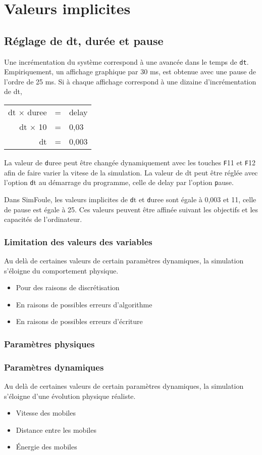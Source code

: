 %
\section{Valeurs implicites}
%
%
\subsection{Réglage de dt, durée et pause}
Une incrémentation du système correspond à une avancée dans le temps de \texttt{dt}.
Empiriquement, un affichage graphique par 30 ms, est obtenue avec une pause de l'ordre de 25 ms. Si à chaque affichage correspond à une dizaine d'incrémentation de dt, 
\begin{center}
	\begin{tabular}{rcl}
	dt $\times$ duree & = & delay\\
	dt $\times$ 10 & = & 0,03\\
	dt & = & 0,003\\
	\end{tabular}
\end{center}
La valeur de {\texttt duree} peut être changée dynamiquement avec les touches {\texttt F11} et {\texttt F12} afin de faire varier la vitese de la simulation. La valeur de dt peut être réglée avec l'option {\texttt dt} au démarrage du programme, celle de delay par l'option {\texttt pause}.

Dans SimFoule, les valeurs implicites de {\texttt dt} et {\texttt duree} sont égale à 0,003 et 11, celle de pause est égale à 25. Ces valeurs peuvent être affinée suivant les objectifs et les capacités de l'ordinateur.
%
%
%
%
%
\subsubsection{Limitation des valeurs des variables}
%
Au delà de certaines valeurs de certain paramètres dynamiques, la simulation s'éloigne du comportement physique.
\begin{itemize}[label=, leftmargin=2cm]
\item Pour des raisons de discrétisation
\item En raisons de possibles erreurs d'algorithme
\item En raisons de possibles erreurs d'écriture
\end{itemize}
%
%
\subsubsection{Paramètres physiques}
%
%
\subsubsection{Paramètres dynamiques}
%
Au delà de certaines valeurs de certain paramètres dynamiques, la simulation s'éloigne d'une évolution physique réaliste.
\begin{itemize}[label=, leftmargin=2cm]
\item Vitesse des mobiles
\item Distance entre les mobiles
\item Énergie des mobiles
\end{itemize}
%

